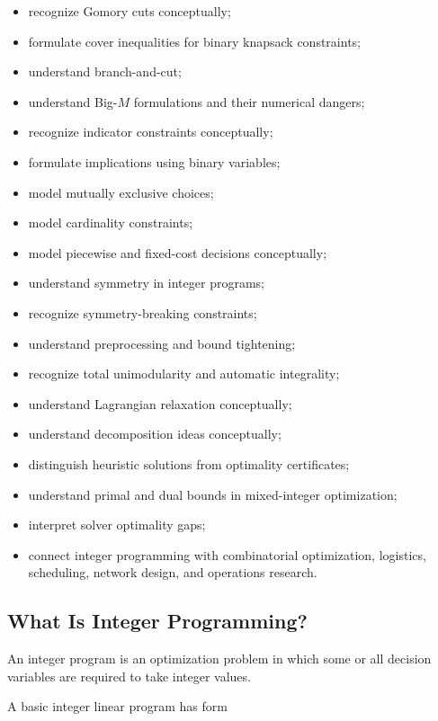{\begin{itemize}
    \item recognize Gomory cuts conceptually;
    \item formulate cover inequalities for binary knapsack constraints;
    \item understand branch-and-cut;
    \item understand Big-\(M\) formulations and their numerical dangers;
    \item recognize indicator constraints conceptually;
    \item formulate implications using binary variables;
    \item model mutually exclusive choices;
    \item model cardinality constraints;
    \item model piecewise and fixed-cost decisions conceptually;
    \item understand symmetry in integer programs;
    \item recognize symmetry-breaking constraints;
    \item understand preprocessing and bound tightening;
    \item recognize total unimodularity and automatic integrality;
    \item understand Lagrangian relaxation conceptually;
    \item understand decomposition ideas conceptually;
    \item distinguish heuristic solutions from optimality certificates;
    \item understand primal and dual bounds in mixed-integer optimization;
    \item interpret solver optimality gaps;
    \item connect integer programming with combinatorial optimization,
          logistics, scheduling, network design, and operations research.
\end{itemize}
}

\subsection{What Is Integer Programming?}
\label{subsec:what-is-integer-programming}

An integer program is an optimization problem in which some or all
decision variables are required to take integer values.

A basic integer linear program has form

